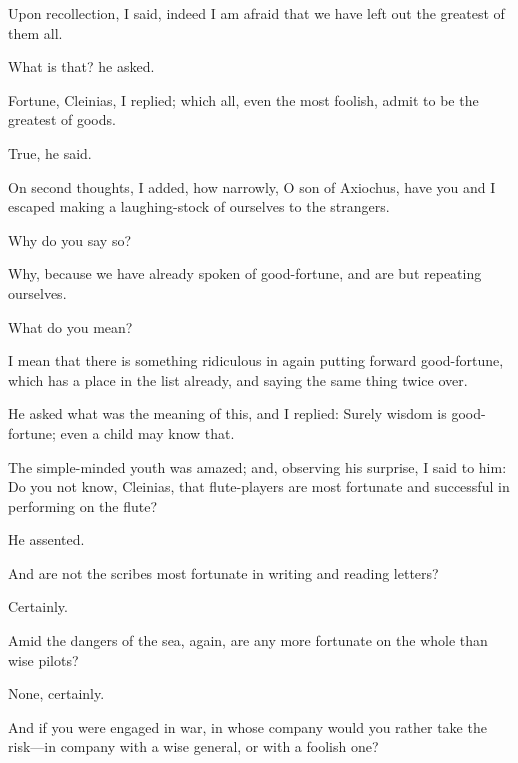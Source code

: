 \documentclass[11pt,letter]{article}
\begin{document}
\par  Upon recollection, I said, indeed I am afraid that we have left out the greatest of them all.

\par  What is that? he asked.

\par  Fortune, Cleinias, I replied; which all, even the most foolish, admit to be the greatest of goods.

\par  True, he said.

\par  On second thoughts, I added, how narrowly, O son of Axiochus, have you and I escaped making a laughing-stock of ourselves to the strangers.

\par  Why do you say so?

\par  Why, because we have already spoken of good-fortune, and are but repeating ourselves.

\par  What do you mean?

\par  I mean that there is something ridiculous in again putting forward good-fortune, which has a place in the list already, and saying the same thing twice over.

\par  He asked what was the meaning of this, and I replied: Surely wisdom is good-fortune; even a child may know that.

\par  The simple-minded youth was amazed; and, observing his surprise, I said to him: Do you not know, Cleinias, that flute-players are most fortunate and successful in performing on the flute?

\par  He assented.

\par  And are not the scribes most fortunate in writing and reading letters?

\par  Certainly.

\par  Amid the dangers of the sea, again, are any more fortunate on the whole than wise pilots?

\par  None, certainly.

\par  And if you were engaged in war, in whose company would you rather take the risk—in company with a wise general, or with a foolish one?
\end{document}

